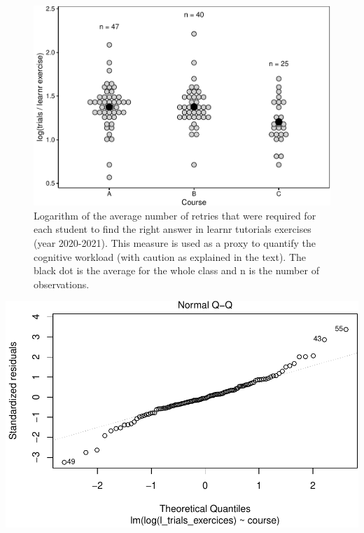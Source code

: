 \documentclass{aims}
\theoremstyle{definition}
\begin{document}
\begin{figure}
\includegraphics[width=1\linewidth]{teaching_data_science_files/figure-latex/fig_learn_trials-1} \caption{\label{fig:fig_learn_trials} Logarithm of the average number of retries that were required for each student to find the right answer in learnr tutorials exercises (year 2020-2021). This measure is used as a proxy to quantify the cognitive workload (with caution as explained in the text). The black dot is the average for the whole class and n is the number of observations.}\label{fig:fig_learn_trials}
\end{figure}

\includegraphics{teaching_data_science_files/figure-latex/unnamed-chunk-1-1.pdf}
\end{document}
